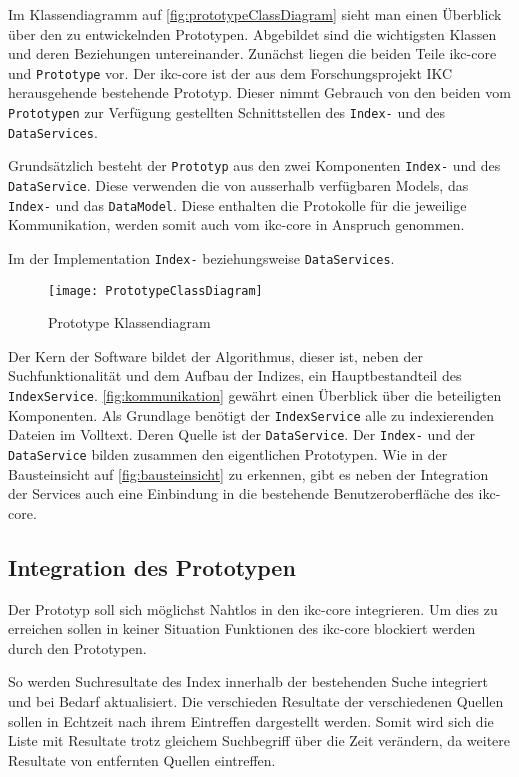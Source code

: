 Im Klassendiagramm auf \autoref{fig:prototypeClassDiagram} sieht man einen Überblick über den zu entwickelnden Prototypen. Abgebildet sind die wichtigsten Klassen und deren Beziehungen untereinander. Zunächst liegen die beiden Teile \gls{ikc-core} und \texttt{Prototype} vor. Der \gls{ikc-core} ist der aus dem Forschungsprojekt \gls{IKC} herausgehende bestehende Prototyp. Dieser nimmt Gebrauch von den beiden vom \texttt{Prototypen} zur Verfügung gestellten Schnittstellen des \texttt{Index-} und des \texttt{DataServices}.

Grundsätzlich besteht der \texttt{Prototyp} aus den zwei Komponenten \texttt{Index-} und des \texttt{DataService}. Diese verwenden die von ausserhalb ver\-füg\-bar\-en Models, das \texttt{In\-dex-} und das \texttt{DataModel}. Diese enthalten die Protokolle für die jeweilige Kommunikation, werden somit auch vom \gls{ikc-core} in Anspruch genommen.

Im der Implementation \texttt{Index-} beziehungsweise \texttt{DataServices}.

    \begin{figure}[H]
    \centering
    \texttt{[image: PrototypeClassDiagram]}
    \caption{Prototype Klassendiagram}
    \label{fig:prototypeClassDiagram-easy}
    \end{figure}

Der Kern der Software bildet der Algorithmus, dieser ist, neben der Suchfunktionalität und dem Aufbau der Indizes, ein Hauptbestandteil des \texttt{IndexService}. \autoref{fig:kommunikation} gewährt einen Überblick über die beteiligten Komponenten. Als Grundlage benötigt der \texttt{In\-dex\-Ser\-vice} alle zu indexierenden Dateien im Volltext. Deren Quelle ist der \texttt{Data\-Ser\-vice}. Der \texttt{Index-} und der \texttt{DataService} bilden zusammen den eigentlichen Prototypen. Wie in der Bausteinsicht auf \autoref{fig:bausteinsicht} zu erkennen, gibt es neben der Integration der Services auch eine Einbindung in die bestehende Benutzeroberfläche des \gls{ikc-core}.


\subsection{Integration des Prototypen}
Der Prototyp soll sich möglichst Nahtlos in den \gls{ikc-core} integrieren. Um dies zu erreichen sollen in keiner Situation Funktionen des \gls{ikc-core} blockiert werden durch den Prototypen. 

So werden Suchresultate des Index innerhalb der bestehenden Suche integriert und bei Bedarf aktualisiert. Die verschieden Resultate der verschiedenen Quellen sollen in Echtzeit nach ihrem Eintreffen dargestellt werden. Somit wird sich die Liste mit Resultate trotz gleichem Suchbegriff über die Zeit verändern, da weitere Resultate von entfernten Quellen eintreffen. 

